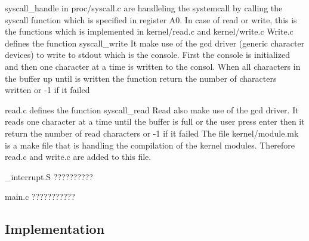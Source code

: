 \documentclass[a4paper,12pt,danish]{report}
\begin{document}
syscall_handle in proc/syscall.c are handleling the systemcall by calling the syscall function which is specified in register A0.
In case of read or write, this is the functions which is implemented in kernel/read.c and kernel/write.c
Write.c defines the function syscall_write
It make use of the gcd driver (generic character devices) to write to stdout which is the console.
First the console is initialized and then one character at a time is written to the consol. 
When all characters in the buffer up until \0 is written the function return the number of characters written or -1 if it failed

read.c defines the function syscall_read
Read also make use of the gcd driver. It reads one character at a time until the buffer is full or the user press enter then it return the number of read characters or -1 if it failed
The file kernel/module.mk is a make file that is handling the compilation of the kernel modules. Therefore read.c and write.c are added to this file.

_interrupt.S ??????????

main.c ???????????

\subsection{Implementation}
\end{document}

